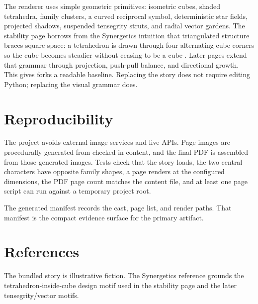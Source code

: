 \documentclass[
]{article}
\begin{document}
The renderer uses simple geometric primitives: isometric cubes, shaded
tetrahedra, family clusters, a curved reciprocal symbol, deterministic
star fields, projected shadows, suspended tensegrity struts, and radial
vector gardens. The stability page borrows from the Synergetics
intuition that triangulated structure braces square space: a tetrahedron
is drawn through four alternating cube corners so the cube becomes
steadier without ceasing to be a cube \citep{fuller1975synergetics}.
Later pages extend that grammar through projection, push-pull balance,
and directional growth. This gives forks a readable baseline. Replacing
the story does not require editing Python; replacing the visual grammar
does.

\newpage

\section{Reproducibility}\label{reproducibility}

The project avoids external image services and live APIs. Page images
are procedurally generated from checked-in content, and the final PDF is
assembled from those generated images. Tests check that the story loads,
the two central characters have opposite family shapes, a page renders
at the configured dimensions, the PDF page count matches the content
file, and at least one page script can run against a temporary project
root.

The generated manifest records the cast, page list, and render paths.
That manifest is the compact evidence surface for the primary artifact.

\newpage

\section{References}\label{references}

The bundled story is illustrative fiction. The Synergetics reference
grounds the tetrahedron-inside-cube design motif used in the stability
page and the later tensegrity/vector motifs.



\clearpage


\end{document}
